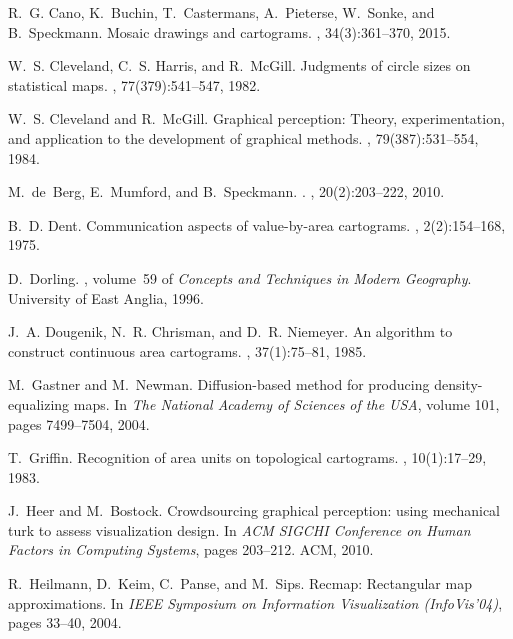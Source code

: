 \documentclass[10pt,journal,compsoc]{IEEEtran}
\begin{document}
\begin{thebibliography}{10}
R.~G. Cano, K.~Buchin, T.~Castermans, A.~Pieterse, W.~Sonke, and B.~Speckmann.
\newblock Mosaic drawings and cartograms.
, 34(3):361--370, 2015.

W.~S. Cleveland, C.~S. Harris, and R.~McGill.
\newblock Judgments of circle sizes on statistical maps.
,
  77(379):541--547, 1982.

W.~S. Cleveland and R.~McGill.
\newblock Graphical perception: Theory, experimentation, and application to the
  development of graphical methods.
,
  79(387):531--554, 1984.

M.~de~Berg, E.~Mumford, and B.~Speckmann.
.
, 20(2):203--222, 2010.

B.~D. Dent.
\newblock Communication aspects of value-by-area cartograms.
, 2(2):154--168, 1975.

D.~Dorling.
, volume~59 of {\em
  Concepts and Techniques in Modern Geography}.
\newblock University of East Anglia, 1996.

J.~A. Dougenik, N.~R. Chrisman, and D.~R. Niemeyer.
\newblock An algorithm to construct continuous area cartograms.
, 37(1):75--81, 1985.

M.~Gastner and M.~Newman.
\newblock Diffusion-based method for producing density-equalizing maps.
\newblock In {\em The National Academy of Sciences of the USA}, volume 101,
  pages 7499--7504, 2004.

T.~Griffin.
\newblock Recognition of area units on topological cartograms.
, 10(1):17--29, 1983.

J.~Heer and M.~Bostock.
\newblock Crowdsourcing graphical perception: using mechanical turk to assess
  visualization design.
\newblock In {\em {ACM SIGCHI} Conference on Human Factors in Computing
  Systems}, pages 203--212. ACM, 2010.

R.~Heilmann, D.~Keim, C.~Panse, and M.~Sips.
\newblock Recmap: Rectangular map approximations.
\newblock In {\em IEEE Symposium on Information Visualization (InfoVis'04)},
  pages 33--40, 2004.


\end{thebibliography}
\end{document}
